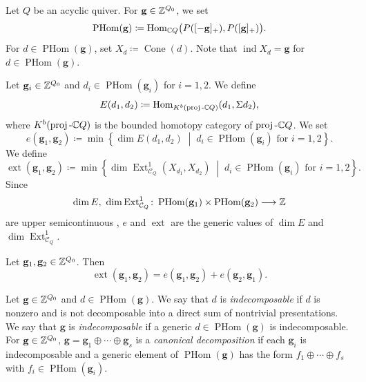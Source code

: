 Let $Q$ be an acyclic quiver.
For $\mathbf{g} \in \mathbb{Z}^{Q_0}$, we set
\[
\operatorname{PHom}(\mathbf{g})
\coloneq \operatorname{Hom}_{\mathbb{C} Q}
\bigl(P([-\mathbf{g}]_+), P([\mathbf{g}]_+)\bigr).
\]
For $d \in \operatorname{PHom}(\mathbf{g})$, set
$X_d \coloneq \operatorname{Cone}(d)$.
Note that $\operatorname{ind}X_d = \mathbf{g}$
for $d \in \operatorname{PHom}(\mathbf{g})$.

\begin{Def}[{\cite[Definition 3.3]{DF15}}]
\label{Def : E invariant of presentations}
Let $\mathbf{g}_i \in \mathbb{Z}^{Q_0}$ and
$d_i \in \operatorname{PHom}(\mathbf{g}_i)$ for $i = 1, 2$.
We define
\[
E(d_1, d_2)
\coloneq
\operatorname{Hom}_{K^b(\operatorname{proj}\text{-}\mathbb{C} Q)}
(d_1, \Sigma d_2),
\]
where $K^b(\operatorname{proj}\text{-}\mathbb{C} Q)$ is the bounded homotopy
category of $\operatorname{proj}\text{-}\mathbb{C} Q$.
We set
\[
e(\mathbf{g}_1, \mathbf{g}_2)
\coloneq
\min\left\{
\dim E(d_1, d_2)
\;\middle|\;
 d_i \in \operatorname{PHom}(\mathbf{g}_i) \text{ for } i = 1, 2
\right\}.
\]
We define
\[
\operatorname{ext}(\mathbf{g}_1, \mathbf{g}_2)
\coloneq
\min\left\{
\dim\operatorname{Ext}^1_{\mathcal{C}_Q}(X_{d_1}, X_{d_2})
\;\middle|\;
 d_i \in \operatorname{PHom}(\mathbf{g}_i) \text{ for } i = 1, 2
\right\}.
\]
Since
\[
\dim E,\ \dim\operatorname{Ext}^1_{\mathcal{C}_Q}
\colon
\operatorname{PHom}(\mathbf{g}_1) \times \operatorname{PHom}(\mathbf{g}_2)
\longrightarrow \mathbb{Z}
\]
are upper semicontinuous \cite[Corollary 3.7]{DF15},
$e$ and $\operatorname{ext}$ are the generic values of
$\dim E$ and $\dim\operatorname{Ext}^1_{\mathcal{C}_Q}$.
\end{Def}

\begin{Prop}
\label{Prop : generic cluster extensions and E invariants}
Let $\mathbf{g}_1, \mathbf{g}_2 \in \mathbb{Z}^{Q_0}$.
Then
\[
\operatorname{ext}(\mathbf{g}_1, \mathbf{g}_2)
= e(\mathbf{g}_1, \mathbf{g}_2) + e(\mathbf{g}_2, \mathbf{g}_1).
\]
\end{Prop}

\begin{Def}[{\cite[Definition 4.3]{DF15}}]
\label{Def : canonical decomposition of indices}
Let $\mathbf{g} \in \mathbb{Z}^{Q_0}$ and $d \in \operatorname{PHom}(\mathbf{g})$.
We say that $d$ is \emph{indecomposable} if $d$ is nonzero and
is not decomposable into a direct sum of nontrivial presentations.
We say that $\mathbf{g}$ is \emph{indecomposable} if a generic
$d \in \operatorname{PHom}(\mathbf{g})$ is indecomposable.
For $\mathbf{g} \in \mathbb{Z}^{Q_0}$,
$\mathbf{g} = \mathbf{g}_1 \oplus \cdots \oplus \mathbf{g}_s$ is a
\emph{canonical decomposition} if each $\mathbf{g}_i$ is indecomposable and
a generic element of $\operatorname{PHom}(\mathbf{g})$ has the form
$f_1 \oplus \cdots \oplus f_s$ with
$f_i \in \operatorname{PHom}(\mathbf{g}_i)$.
\end{Def}

